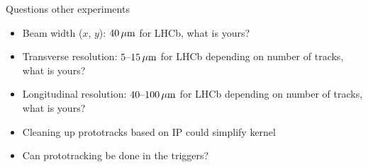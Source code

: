 \begin{frame}{Questions other experiments}
    \begin{itemize}
      \item
          Beam width ($x$, $y$): $\unit[40]{\mu m}$ for LHCb, what is yours?
      \item
          Transverse resolution: $\unit[5\textup{--}15]{\mu m}$ for LHCb depending on number of tracks, what is yours?
      \item
          Longitudinal resolution: $\unit[40\textup{--}100]{\mu m}$ for LHCb depending on number of tracks, what is yours?
      \item
          Cleaning up prototracks based on IP could simplify kernel
      \item
          Can prototracking be done in the triggers?
    \end{itemize}
\end{frame}
